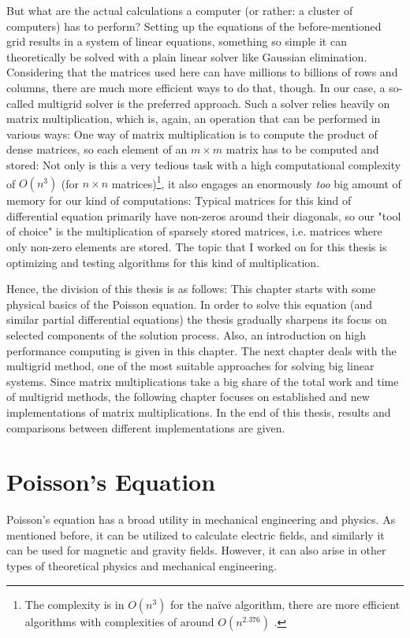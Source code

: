 But what are the actual calculations a computer (or rather: a cluster of computers) has to perform? Setting up the equations of the before-mentioned grid results in a system of linear equations, something so simple it can theoretically be solved with a plain linear solver like Gaussian elimination. Considering that the matrices used here can have millions to billions of rows and columns, there are much more efficient ways to do that, though. In our case, a so-called multigrid solver is the preferred approach. Such a solver relies heavily on matrix multiplication, which is, again, an operation that can be performed in various ways: One way of matrix multiplication is to compute the product of dense matrices, so each element of an $m\times m$ matrix has to be computed and stored: Not only is this a very tedious task with a high computational complexity of $O(n^3)$ (for $n\times n$  matrices)\footnote{The complexity is in $O(n^3)$ for the naïve algorithm, there are more efficient algorithms with complexities of around $O(n^{2.376})$ \cite{COPPERSMITH1990251}.}, it also engages an enormously \textit{too} big amount of memory for our kind of computations: Typical matrices for  this kind of differential equation primarily have non-zeros around their diagonals, so our "tool of choice" is the multiplication of sparsely stored matrices, i.e. matrices where only non-zero elements are stored. The topic that I worked on for this thesis is optimizing and testing algorithms for this kind of multiplication.

Hence, the division of this thesis is as follows: This chapter starts with some physical basics of the Poisson equation. In order to solve this equation (and similar partial differential equations) the thesis gradually sharpens its focus on selected components of the solution process. Also, an introduction on high performance computing is given in this chapter. The next chapter deals with the multigrid method, one of the most suitable approaches for solving big linear systems. Since matrix multiplications take a big share of the total work and time of multigrid methods, the following chapter focuses on established and new implementations of matrix multiplications. In the end of this thesis, results and comparisons between different implementations are given. 


\section{Poisson's Equation}
Poisson's equation has a broad utility in mechanical engineering and physics. As mentioned before, it can be utilized to calculate electric fields, and similarly it can be used for magnetic and gravity fields. However, it can also arise in other types of theoretical physics and mechanical engineering. 

